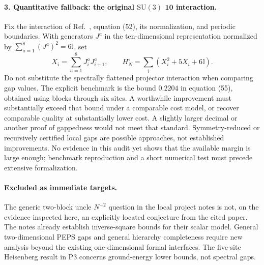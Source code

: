\documentclass{article}
\newcommand{\id}{\mathbb I}
\begin{document}
\paragraph{3. Quantitative fallback: the original $\mathrm{SU}(3)$
$\mathbf{10}$ interaction.}
Fix the interaction of Ref.~\cite{RMS}, equation (52), its normalization,
and periodic boundaries. With generators $J^a$ in the ten-dimensional
representation normalized by $\sum_{a=1}^8(J^a)^2=6\id$, set
\begin{equation}
  X_i=\sum_{a=1}^8J_i^aJ_{i+1}^a,
  \qquad H_N^{\circ}=\sum_i(X_i^2+5X_i+6\id).
\end{equation}
Do not substitute the spectrally flattened projector interaction when
comparing gap values. The explicit benchmark is the bound $0.2204$ in
equation (55), obtained using blocks through six sites. A worthwhile
improvement must substantially exceed that bound under a comparable cost
model, or recover comparable quality at substantially lower cost. A
slightly larger decimal or another proof of gappedness would not meet that
standard. Symmetry-reduced or recursively certified local gaps are possible
approaches, not established improvements. No evidence in this audit yet
shows that the available margin is large enough; benchmark reproduction
and a short numerical test must precede extensive formalization.

\paragraph{Excluded as immediate targets.}
The generic two-block uncle $N^{-2}$ question in the local project notes
is not, on the evidence inspected here, an explicitly located conjecture
from the cited paper. The notes already establish inverse-square bounds
for their scalar model. General two-dimensional PEPS gaps and general
hierarchy completeness require new analysis beyond the existing
one-dimensional formal interfaces. The five-site Heisenberg result in
P3 concerns ground-energy lower bounds, not spectral gaps.
\end{document}
